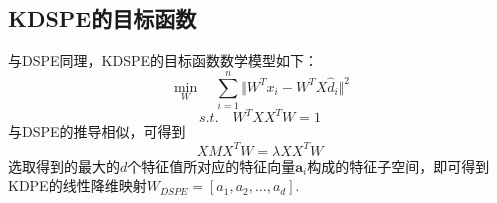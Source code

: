\subsection{KDSPE的目标函数}
与DSPE同理，KDSPE的目标函数数学模型如下：
$$\min_{W}\quad\sum_{i=1}^{n}\Vert{W^{T}x_{i}-W^{T}X\hat{d}_{i}}\Vert^{2}$$
$$s.t.\quad W^{T}XX^{T}W = 1$$
与DSPE的推导相似，可得到
$$XMX^{T}W = \lambda XX^{T}W$$
选取得到的最大的$d$个特征值所对应的特征向量$\mathbf{a}_{i}$构成的特征子空间，即可得到KDPE的线性降维映射$W_{DSPE}=[a_{1},a_{2},\ldots,a_{d}]$.